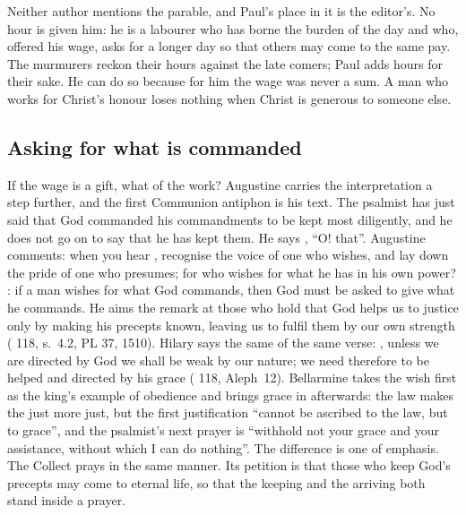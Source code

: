 Neither author mentions the parable, and Paul's place in it is the editor's.
No hour is given him: he is a labourer who has borne the burden of the day
and who, offered his wage, asks for a longer day so that others may come to
the same pay. The murmurers reckon their hours
against the late comers; Paul adds hours for their sake. He can do so because
for him the wage was never a sum. A man who works for Christ's honour loses
nothing when Christ is generous to someone else.

\subsection{Asking for what is commanded}

If the wage is a gift, what of the work? Augustine carries the interpretation a
step further, and the first Communion antiphon is his text. The psalmist has just
said that God commanded his commandments to be kept most diligently, and he
does not go on to say that he has kept them. He says , ``O!
that''. Augustine comments: when you hear , recognise the voice
of one who wishes, and lay down the pride of one who presumes; for who wishes
for what he has in his own power? : if a man wishes for what
God commands, then God must be asked to give what he commands. He aims the
remark at those who hold that God helps us to justice only by making his
precepts known, leaving us to fulfil them by our own strength
( 118, s.~4.2, PL 37, 1510). Hilary says the same
of the same verse: , unless we are
directed by God we shall be weak by our nature; we need therefore to be helped
and directed by his grace ( 118, Aleph~12).
Bellarmine takes the wish first as the king's example of obedience and brings
grace in afterwards: the law makes the just more just, but the first
justification ``cannot be ascribed to the law, but to grace'', and the
psalmist's next prayer is ``withhold not your grace and your assistance,
without which I can do nothing''. The difference is one of emphasis. The
Collect prays in the same manner. Its petition is that those who keep God's
precepts may come to eternal life, so that the keeping and the arriving both
stand inside a prayer.

